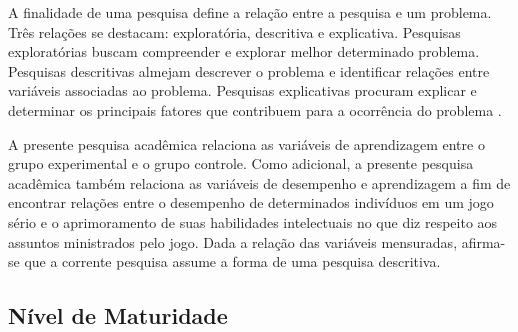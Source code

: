 \vspace{-0.14cm}

A  finalidade de uma pesquisa define a relação entre a pesquisa e um problema. Três relações se destacam: exploratória, descritiva e explicativa. Pesquisas exploratórias buscam compreender e explorar melhor determinado problema. Pesquisas descritivas almejam descrever o problema e identificar relações entre variáveis associadas ao problema. Pesquisas explicativas procuram explicar e determinar os principais fatores que contribuem para a ocorrência do problema \cite{trivinos2009introduccao}. 

A presente pesquisa acadêmica relaciona as variáveis de aprendizagem entre o grupo experimental e o grupo controle. Como adicional, a presente pesquisa acadêmica também relaciona as variáveis de desempenho e aprendizagem a fim de encontrar relações entre o desempenho de determinados indivíduos em um jogo sério e o aprimoramento de suas habilidades intelectuais no que diz respeito aos assuntos ministrados pelo jogo. Dada a relação das variáveis mensuradas, afirma-se que a corrente pesquisa assume a forma de uma pesquisa descritiva. 











\subsection{Nível de Maturidade}\label{sub:maturidade}


